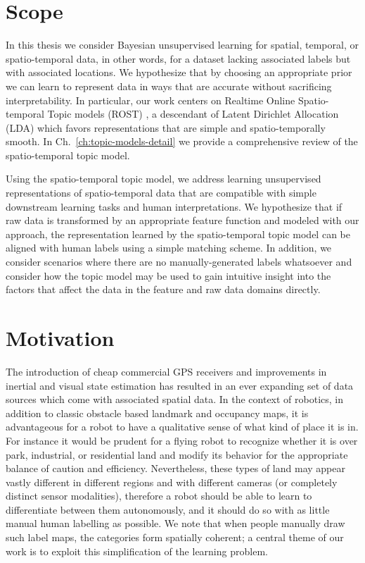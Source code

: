 \section{Scope}
In this thesis we consider Bayesian unsupervised learning for spatial, temporal, or spatio-temporal data, in other words, for a dataset lacking associated labels but with associated locations. We hypothesize that by choosing an appropriate prior we can learn to represent data in ways that are accurate without sacrificing interpretability. In particular, our work centers on Realtime Online Spatio-temporal Topic models (ROST) \citep{Girdhar2014}, a descendant of Latent Dirichlet Allocation (LDA) \citep{Blei2003} which favors representations that are simple and spatio-temporally smooth. In Ch.~\ref{ch:topic-models-detail} we provide a comprehensive review of the spatio-temporal topic model.

Using the spatio-temporal topic model, we address learning unsupervised representations of spatio-temporal data that are compatible with simple downstream learning tasks and human interpretations. We hypothesize that if raw data is transformed by an appropriate feature function and modeled with our approach, the representation learned by the spatio-temporal topic model can be aligned with human labels using a simple matching scheme. In addition, we consider scenarios where there are no manually-generated labels whatsoever and consider how the topic model may be used to gain intuitive insight into the factors that affect the data in the feature and raw data domains directly.

\section{Motivation}
The introduction of cheap commercial GPS receivers and improvements in inertial and visual state estimation has resulted in an ever expanding set of data sources which come with associated spatial data. In the context of robotics, in addition to classic obstacle based landmark and occupancy maps, it is advantageous for a robot to have a qualitative sense of what kind of place it is in. For instance it would be prudent for a flying robot to recognize whether it is over park, industrial, or residential land and modify its behavior for the appropriate balance of caution and efficiency. Nevertheless, these types of land may appear vastly different in different regions and with different cameras (or completely distinct sensor modalities), therefore a robot should be able to learn to differentiate between them autonomously, and it should do so with as little manual human labelling as possible. We note that when people manually draw such label maps, the categories form spatially coherent; a central theme of our work is to exploit this simplification of the learning problem.

